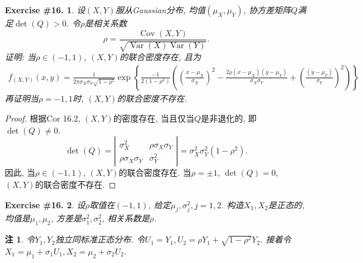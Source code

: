 \documentclass[UTF8, a4paper]{article}
\newtheorem{exercise}{Exercise \#16.}
\newtheorem*{remark}{注}
\begin{document}
\begin{framed}
\begin{exercise}
设\((X,Y)\)服从Gaussian分布, 均值\((\mu_X, \mu_Y)\), 协方差矩阵\(Q\)满足\(\det(Q) > 0\).
令\(\rho\)是相关系数
$$
\rho=\frac{\operatorname{Cov}(X, Y)}{\sqrt{\operatorname{Var}(X) \operatorname{Var}(Y)}} .
$$
证明: 当\(\rho \in (-1, 1)\), \((X,Y)\)的联合密度存在, 且为$$
\begin{array}{r}
f_{(X, Y)}(x, y)=\frac{1}{2 \pi \sigma_X \sigma_Y \sqrt{1-\rho^2}} \exp \left\{\frac { - 1 } { 2 ( 1 - \rho ^ { 2 } ) } \left(\left(\frac{x-\mu_X}{\sigma_X}\right)^2 -\frac{2 \rho\left(x-\mu_X\right)\left(y-\mu_Y\right)}{\sigma_X \sigma_Y}+\left(\frac{\left(y-\mu_Y\right)}{\sigma_Y}\right)^2\right)\right\}
\end{array}
$$
再证明当\(\rho = -1,1\)时, \((X,Y)\)的联合密度不存在.
\end{exercise}
\end{framed}


\begin{proof}
根据Cor 16.2, \((X,Y)\)的密度存在, 当且仅当\(Q\)是非退化的, 即\(\det(Q) \neq 0\).
$$
\det(Q) = \left| \begin{matrix}
    \sigma_X^2 & \rho \sigma_X \sigma_Y \\
    \rho \sigma_X \sigma_Y & \sigma_Y^2
\end{matrix}\right| = \sigma_X^2 \sigma_Y^2 (1 - \rho^2).
$$
因此, 当\(\rho \in (-1, 1)\), \((X,Y)\)的联合密度存在.
当\(\rho = \pm 1\), \(\det(Q) = 0\), \((X,Y)\)的联合密度不存在.
\end{proof}


\begin{framed}
\begin{exercise}
设\(\rho\)取值在\((-1, 1)\), 给定\(\mu_j, \sigma_j^2, j=1,2\).
构造\(X_1, X_2\)是正态的, 均值是\(\mu_1, \mu_2\), 方差是\(\sigma_1^2, \sigma_2^2\), 相关系数是\(\rho\).
\end{exercise}
\end{framed}
\begin{remark}
令\(Y_1, Y_2\)独立同标准正态分布. 令\(U_1 = Y_1,  U_2 = \rho Y_1 + \sqrt{1 -\rho^2} Y_2\).
接着令\(X_1 = \mu_1 + \sigma_1 U_1, X_2 = \mu_2 + \sigma_2 U_2\).
\end{remark}
\end{document}
